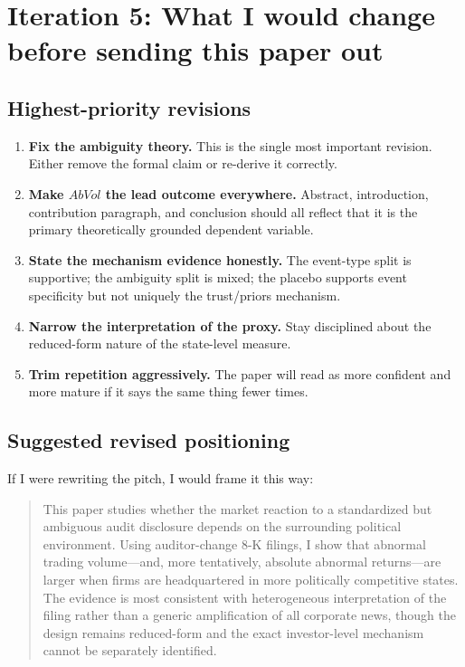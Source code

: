 \documentclass[11pt]{article}
\begin{document}
\section*{Iteration 5: What I would change before sending this paper out}

\subsection*{Highest-priority revisions}
\begin{enumerate}
    \item \textbf{Fix the ambiguity theory.} This is the single most important revision. Either remove the formal claim or re-derive it correctly.
    \item \textbf{Make $AbVol$ the lead outcome everywhere.} Abstract, introduction, contribution paragraph, and conclusion should all reflect that it is the primary theoretically grounded dependent variable.
    \item \textbf{State the mechanism evidence honestly.} The event-type split is supportive; the ambiguity split is mixed; the placebo supports event specificity but not uniquely the trust/priors mechanism.
    \item \textbf{Narrow the interpretation of the proxy.} Stay disciplined about the reduced-form nature of the state-level measure.
    \item \textbf{Trim repetition aggressively.} The paper will read as more confident and more mature if it says the same thing fewer times.
\end{enumerate}

\subsection*{Suggested revised positioning}
If I were rewriting the pitch, I would frame it this way:

\begin{quote}
This paper studies whether the market reaction to a standardized but ambiguous audit disclosure depends on the surrounding political environment. Using auditor-change 8-K filings, I show that abnormal trading volume---and, more tentatively, absolute abnormal returns---are larger when firms are headquartered in more politically competitive states. The evidence is most consistent with heterogeneous interpretation of the filing rather than a generic amplification of all corporate news, though the design remains reduced-form and the exact investor-level mechanism cannot be separately identified.
\end{quote}
\end{document}
